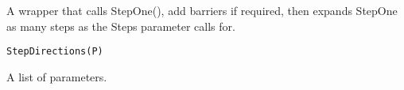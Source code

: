 \documentclass[a4paper]{book}
\begin{document}
%
\begin{Description}\relax
A wrapper that calls StepOne(), add barriers if required, then expands StepOne as many steps as the Steps parameter calls for.
\end{Description}
%
\begin{Usage}
\begin{verbatim}
StepDirections(P)
\end{verbatim}
\end{Usage}
%
\begin{Arguments}
\begin{ldescription}
\item[\code{P}] A list of parameters.
\end{ldescription}
\end{Arguments}
\printindex{}
\end{document}
